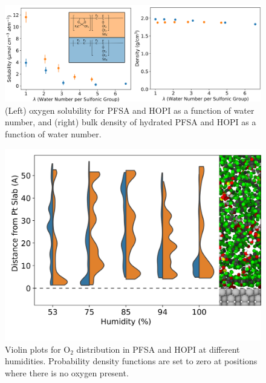 \documentclass[journal=jacsat,manuscript=article]{achemso}
\begin{document}
\begin{figure}[h!]
  \includegraphics[width=\linewidth]{densitysolubility.png}
  \centering
  \caption{(Left) oxygen solubility for PFSA and HOPI as a function of water number, and (right) bulk density of hydrated PFSA and HOPI as a function of water number.}
    \label{fig:solubility}
\end{figure}

\begin{figure}[h!]
  \includegraphics[width=.9\linewidth]{violinplotedited.png}
  \centering
  \caption{Violin plots for O$_2$ distribution in PFSA and HOPI at different humidities. Probability density functions are set to zero at positions where there is no oxygen present.}
    \label{fig:violin-plots}
\end{figure}
\end{document}
